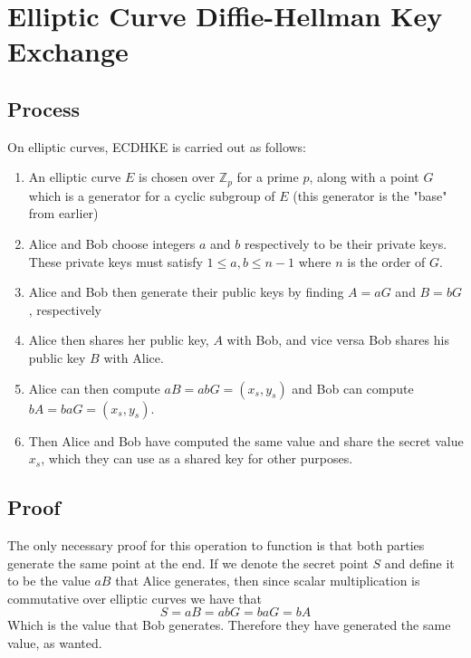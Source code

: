 \documentclass{article}
\theoremstyle{plain}
\theoremstyle{definition}
\newcommand{\bb}[1]{\mathbb{#1}}
\begin{document}
\section{Elliptic Curve Diffie-Hellman Key Exchange}\label{ECDHKE}

        \subsection{Process}\label{process}

                On elliptic curves, ECDHKE is carried out as follows: %
                \begin{enumerate}[Step 1.]
                \item An elliptic curve $E$ is chosen over $\bb{Z}_p$ for a prime $p$, along with a point $G$ which is a generator for a cyclic subgroup of $E$ (this generator is the "base" from earlier)
                \item Alice and Bob choose integers $a$ and $b$ respectively to be their private keys. These private keys must satisfy $1 \leq a, b \leq n - 1$ where $n$ is the order of $G$.
                \item Alice and Bob then generate their public keys by finding $A = aG$ and $B = bG$, respectively
                \item Alice then shares her public key, $A$ with Bob, and vice versa Bob shares his public key $B$ with Alice.
                \item Alice can then compute $aB = a b G = (x_s, y_s)$ and Bob can compute $bA = b a G = (x_s, y_s)$.
                \item Then Alice and Bob have computed the same value and share the secret value $x_s$, which they can use as a shared key for other purposes.
                \end{enumerate}

        \subsection{Proof}\label{proof}

                The only necessary proof for this operation to function is that both parties generate the same point at the end.
                If we denote the secret point $S$ and define it to be the value $aB$ that Alice generates, then since scalar multiplication is commutative over elliptic curves we have that 
                        $$ S = a B = a b G = b a G = b A$$
                Which is the value that Bob generates.
                Therefore they have generated the same value, as wanted.
\end{document}
